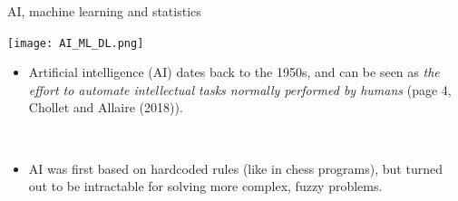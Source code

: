 \documentclass[10pt,ignorenonframetext,]{beamer}
\providecommand{\tightlist}{%
  \setlength{\itemsep}{0pt}\setlength{\parskip}{0pt}}
\begin{document}
\begin{frame}

\begin{block}{AI, machine learning and statistics}

\texttt{[image: AI\_ML\_DL.png]}

\end{block}

\end{frame}

\begin{frame}

\begin{itemize}
\tightlist
\item
  Artificial intelligence (AI) dates back to the 1950s, and can be seen
  as \emph{the effort to automate intellectual tasks normally performed
  by humans} (page 4, Chollet and Allaire (2018)).
\end{itemize}

\(~\)

\begin{itemize}
\tightlist
\item
  AI was first based on hardcoded rules (like in chess programs), but
  turned out to be intractable for solving more complex, fuzzy problems.
\end{itemize}

\(~\)

\end{frame}
\end{document}

